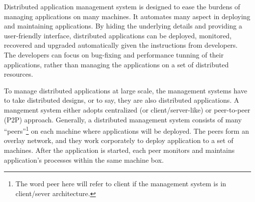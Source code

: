 



Distributed application management system is designed to
ease the burdens of managing applications on many machines.
It automates many aspect in deploying and maintaining
applications. By hiding the underlying details and providing
a user-friendly interface, distributed applications can be
deployed, monitored, recovered and upgraded automatically
given the instructions from developers. The developers can
focus on bug-fixing and performance tunning of their
applications, rather than managing the applications on a set
of distributed resources.

To manage distributed applications at large scale, the
management systems have to take distributed designs, or to
say, they are also distributed applications. A mangement
system either adopts centralized (or client/server-like) or
peer-to-peer (P2P) approach.  Generally, a distributed
management system consists of many ``peers''\footnote{The
word peer here will refer to client if the management system
is in client/sever architecture.} on each machine where
applications will be deployed. The peers form an overlay
network, and they work corporately to deploy application to
a set of machines. After the application is started, each
peer monitors and maintains application's processes within
the same machine box.


